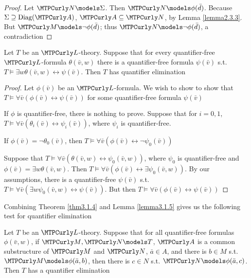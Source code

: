 \documentclass[11pt]{article}
\begin{document}
\begin{proof}
Let \(\caln\models\Sigma\). Then \(\caln\models\phi(\bar{d})\). Because
\(\Sigma\supseteq\Diag(\cala)\), \(\cala\subseteq\caln\), by Lemma \ref{lemma2.3.3}.
But \(\calm\models\neg\phi(\bar{d})\); thus \(\caln\models\neg\phi(\bar{d})\), a contradiction
\end{proof}

\begin{lemma}[]
\label{lemma3.1.5}
Let \(T\) be an \(\call\)-theory. Suppose that for every quantifier-free
\(\call\)-formula \(\theta(\bar{v},w)\) there is a quantifier-free formula
\(\psi(\bar{v})\) s.t. \(T\models\exists w\theta(\bar{v},w)\leftrightarrow\psi(\bar{v})\). Then \(T\)
has quantifier elimination
\end{lemma}

\begin{proof}
Let \(\phi(\bar{v})\) be an \(\call\)-formula. We wish to show to show that
\(T\models\forall\bar{v}(\phi(\bar{v})\leftrightarrow\psi(\bar{v}))\) for some quantifier-free
formula \(\psi(\bar{v})\)

If \(\phi\) is quantifier-free, there is nothing to prove. Suppose that for
\(i=0,1\), \(T\models\forall\bar{v}(\theta_i(\bar{v})\leftrightarrow\psi_i(\bar{v}))\), where
\(\psi_{i}\) is quantifier-free.

If \(\phi(\bar{v})=\neg\theta_0(\bar{v})\), then
\(T\models\forall\bar{v}(\phi(\bar{v})\leftrightarrow\neg\psi_0(\bar{v}))\)

Suppose that \(T\models\forall\bar{v}(\theta(\bar{v},w)\leftrightarrow\psi_0(\bar{v},w))\), where
\(\psi_0\) is quantifier-free and \(\phi(\bar{v})=\exists w\theta(\bar{v},w)\). Then
\(T\models\forall\bar{v}(\phi(\bar{v})\leftrightarrow\exists\psi_0(\bar{v},w))\). By our assumptions,
there is a quantifier-free \(\psi(\bar{v})\) s.t.
\(T\models\forall\bar{v}(\exists w\psi_0(\bar{v},w)\leftrightarrow\psi(\bar{v}))\). But then
\(T\models\forall\bar{v}(\phi(\bar{v})\leftrightarrow\psi(\bar{v}))\)
\end{proof}

Combining Theorem \ref{thm3.1.4} and Lemma \ref{lemma3.1.5} gives us the
following test for quantifier elimination
\begin{corollary}
\label{cor3.1.6}
Let \(T\) be an \(\call\)-theory. Suppose that for all quantifier-free
formulas \(\phi(\bar{v},w)\), if \(\calm,\caln\models T\), \(\cala\) is a common
substructure of \(\calm\) and \(\caln\), \(\bar{a}\in A\), and there is
\(b\in M\) s.t. \(\calm\models\phi(\bar{a},b)\), then there is \(c\in N\) s.t.
\(\caln\models\phi(\bar{a},c)\). Then \(T\) has a quantifier elimination
\end{corollary}
\end{document}
